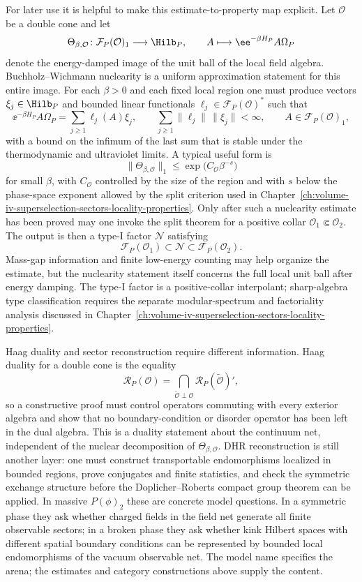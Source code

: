 For later use it is helpful to make this estimate-to-property map explicit.
Let \(\mathcal O\) be a double cone and let
\[
  \Theta_{\beta,\mathcal O}\colon
  \mathcal F_P(\mathcal O)_1\longrightarrow \Hilb_P,\qquad
  A\longmapsto \ee^{-\beta H_P}A\Omega_P
\]
denote the energy-damped image of the unit ball of the local field algebra.
Buchholz--Wichmann nuclearity is a uniform approximation statement for this
entire image.  For each \(\beta>0\) and each fixed local region one must
produce vectors \(\xi_j\in\Hilb_P\) and bounded linear functionals
\(\ell_j\in\mathcal F_P(\mathcal O)^*\) such that
\[
  \ee^{-\beta H_P}A\Omega_P
  =
  \sum_{j\ge1}\ell_j(A)\xi_j,\qquad
  \sum_{j\ge1}\|\ell_j\|\,\|\xi_j\|<\infty ,
  \qquad A\in\mathcal F_P(\mathcal O)_1 ,
\]
with a bound on the infimum of the last sum that is stable under the
thermodynamic and ultraviolet limits.  A typical useful form is
\[
  \|\Theta_{\beta,\mathcal O}\|_1
  \le
  \exp\!\bigl(C_{\mathcal O}\beta^{-s}\bigr)
\]
for small \(\beta\), with \(C_{\mathcal O}\) controlled by the size of the
region and with \(s\) below the phase-space exponent allowed by the split
criterion used in
Chapter~\ref{ch:volume-iv-superselection-sectors-locality-properties}.
Only after such a nuclearity estimate has been proved may one invoke the
split theorem for a positive collar
\(\mathcal O_1\Subset\mathcal O_2\).  The output is then a type-I factor
\(\mathcal N\) satisfying
\[
  \mathcal F_P(\mathcal O_1)
  \subset
  \mathcal N
  \subset
  \mathcal F_P(\mathcal O_2).
\]
Mass-gap information and finite low-energy counting may help organize the
estimate, but the nuclearity statement itself concerns the full local unit
ball after energy damping.  The type-I factor is a positive-collar
interpolant; sharp-algebra type classification requires the separate
modular-spectrum and factoriality analysis discussed in
Chapter~\ref{ch:volume-iv-superselection-sectors-locality-properties}.

Haag duality and sector reconstruction require different information.  Haag
duality for a double cone is the equality
\[
  \mathcal R_P(\mathcal O)
  =
  \bigcap_{\widetilde{\mathcal O}\perp\mathcal O}
  \mathcal R_P(\widetilde{\mathcal O})' ,
\]
so a constructive proof must control operators commuting with every exterior
algebra and show that no boundary-condition or disorder operator has been
left in the dual algebra.  This is a duality statement about the continuum
net, independent of the nuclear decomposition of
\(\Theta_{\beta,\mathcal O}\).  DHR reconstruction is still another layer:
one must construct transportable endomorphisms localized in bounded regions,
prove conjugates and finite statistics, and check the symmetric exchange
structure before the Doplicher--Roberts compact group theorem can be applied.
In massive \(P(\phi)_2\) these are concrete model questions.  In a symmetric
phase they ask whether charged fields in the field net generate all finite
observable sectors; in a broken phase they ask whether kink Hilbert spaces
with different spatial boundary conditions can be represented by bounded
local endomorphisms of the vacuum observable net.  The model name specifies
the arena; the estimates and category constructions above supply the content.

